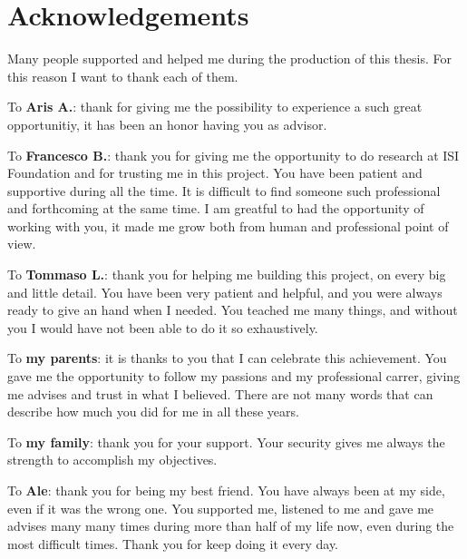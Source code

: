\chapter*{Acknowledgements}

Many people supported and helped me during the production of this thesis. For this reason I want to thank each of them.
\vspace{0.5cm}

To \textbf{Aris A.}: thank for giving me the possibility to experience a such great opportunitiy, it has been an honor having you as advisor.
\vspace{0.5cm}

To \textbf{Francesco B.}: thank you for giving me the opportunity to do research at ISI Foundation and for trusting me in this project. You have been patient and supportive during all the time. It is difficult to find someone such professional and forthcoming at the same time. I am greatful to had the opportunity of working with you, it made me grow both from human and professional point of view.
\vspace{0.5cm}

To \textbf{Tommaso L.}: thank you for helping me building this project, on every big and little detail. You have been very patient and helpful, and you were always ready to give an hand when I needed. You teached me many things, and without you I would have not been able to do it so exhaustively. 
\vspace{0.5cm}

To \textbf{my parents}: it is thanks to you that I can celebrate this achievement. You gave me the opportunity to follow my passions and my professional carrer, giving me advises and trust in what I believed. There are not many words that can describe how much you did for me in all these years.
\vspace{0.5cm}

To \textbf{my family}: thank you for your support. Your security gives me always the strength to accomplish my objectives.
\vspace{0.5cm}

To \textbf{Ale}: thank you for being my best friend. You have always been at my side, even if it was the wrong one. You supported me, listened to me and gave me advises many many times during more than half of my life now, even during the most difficult times. Thank you for keep doing it every day.
\vspace{0.5cm}

